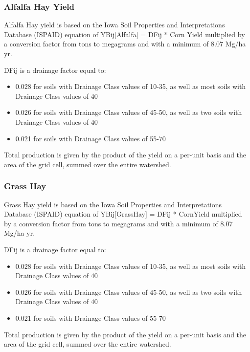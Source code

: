 \documentclass[11pt]{article}
\begin{document}
\subsubsection{Alfalfa Hay Yield}
Alfalfa Hay yield is based on the Iowa Soil Properties and Interpretations Database  (ISPAID) equation of YBij[Alfalfa] = DFij * Corn Yield multiplied by a conversion factor from tons to megagrams and with a minimum of 8.07 Mg/ha yr.\cite{43} 

DFij is a drainage factor equal to:
\begin{itemize}

\item 0.028 for soils with Drainage Class values of 10-35, as well as most soils with Drainage Class values of 40
\item 0.026 for soils with Drainage Class values of 45-50, as well as two soils with Drainage Class values of 40
\item 0.021 for soils with Drainage Class values of 55-70

\end{itemize}

Total production is given by the product of the yield on a per-unit basis and the area of the grid cell, summed over the entire watershed. 

\subsubsection{Grass Hay}
Grass Hay yield is based on the Iowa Soil Properties and Interpretations Database (ISPAID) equation of YBij[GrassHay] = DFij * CornYield multiplied by a conversion factor from tons to megagrams and with a minimum of 8.07 Mg/ha yr.\cite{43} 

DFij is a drainage factor equal to:

\begin{itemize}

\item 0.028 for soils with Drainage Class values of 10-35, as well as most soils with Drainage Class values of 40
\item 0.026 for soils with Drainage Class values of 45-50, as well as two soils with Drainage Class values of 40
\item 0.021 for soils with Drainage Class values of 55-70

\end{itemize}

Total production is given by the product of the yield on a per-unit basis and the area of the grid cell, summed over the entire watershed. 
\end{document}
